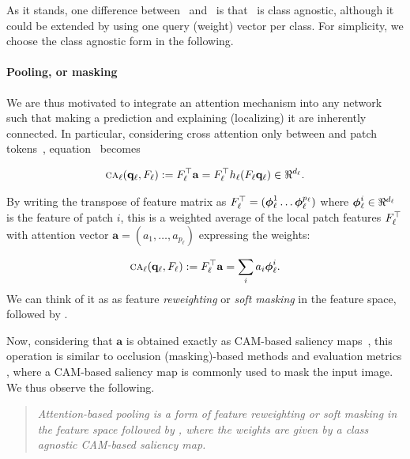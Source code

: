 As it stands, one difference between~ and~ is that~ is class 
agnostic, although it could be extended by using one query (weight) vector per class. For simplicity, 
we choose the class agnostic form in the following. %
\paragraph{Pooling, or masking}
We are thus motivated to integrate an attention mechanism into any network such that making a 
prediction and explaining (localizing) it are inherently connected. In particular, considering 
cross attention only between \cls and patch tokens~, equation~ becomes



\begin{align}
	\ca_\ell(\vq_\ell, F_\ell) \defn F_\ell\tran \mathbf{a} = F_\ell\tran h_\ell(F_\ell \vq_\ell) 
	\in \real^{d_\ell}.
\label{eq:CA}
\end{align}

By writing the transpose of feature matrix as $F_\ell^\top = ({\boldsymbol{\phi}}_\ell^1 \dots 
{\boldsymbol{\phi}}_\ell^{p_\ell})$ where $\vphi_\ell^i \in \real^{d_\ell}$ is the feature of patch $i$, 
this is a weighted average of the local patch features $F_\ell^\top$ with attention vector 
$\mathbf{a} = (a_1, \dots, a_{p_\ell})$ expressing the weights:

\begin{align}
	{\textsc{ca}}_\ell(\mathbf{q}_\ell, F_\ell) \mathrel{:=} F_\ell^\top \mathbf{a} = \sum_i a_i {\boldsymbol{\phi}}_\ell^i.
\label{eq:CA-gap}
\end{align}
We can think of it as as feature \emph{reweighting} or \emph{soft masking} in the feature space, 
followed by \gap.

Now, considering that $\mathbf{a}$ is obtained exactly as CAM-based saliency maps~, 
this operation is similar to occlusion (masking)-based methods \autocite{petsiuk2018rise, 
fong2017interpretable, fong2019understanding, schulz2020restricting, ribeiro2016should,
wang2020score, zhang2023opti} and evaluation metrics \autocite{chattopadhay2018grad, 
petsiuk2018rise}, where a CAM-based saliency map is commonly used to mask the input image. 
We thus observe the following.

\begin{quote}
	\emph{Attention-based pooling is a form of feature reweighting or soft masking in the feature 
	space followed by \gap, where the weights are given by a class agnostic CAM-based saliency map.}
\end{quote}

%